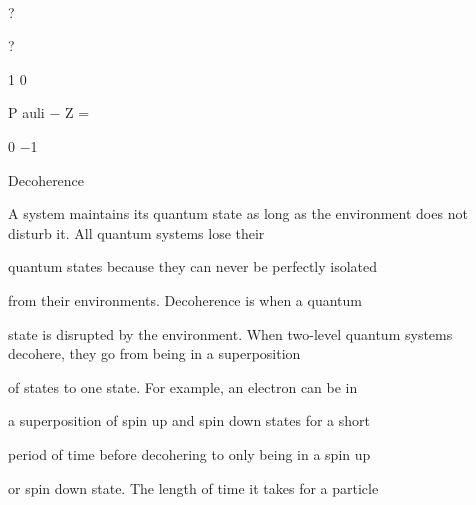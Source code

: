 \documentclass[a4paper,portrait,12pt]{article}
\begin{document}
\begin{flushleft}

\end{flushleft}





?


?


1 0


\begin{flushleft}
P auli $-$ Z =
\end{flushleft}


0 $-$1





\begin{flushleft}
Decoherence
\end{flushleft}





\begin{flushleft}
A system maintains its quantum state as long as the environment does not disturb it. All quantum systems lose their
\end{flushleft}


\begin{flushleft}
quantum states because they can never be perfectly isolated
\end{flushleft}


\begin{flushleft}
from their environments. Decoherence is when a quantum
\end{flushleft}


\begin{flushleft}
state is disrupted by the environment. When two-level quantum systems decohere, they go from being in a superposition
\end{flushleft}


\begin{flushleft}
of states to one state. For example, an electron can be in
\end{flushleft}


\begin{flushleft}
a superposition of spin up and spin down states for a short
\end{flushleft}


\begin{flushleft}
period of time before decohering to only being in a spin up
\end{flushleft}


\begin{flushleft}
or spin down state. The length of time it takes for a particle
\end{flushleft}
\end{document}
